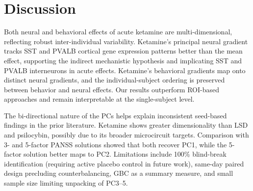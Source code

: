 \documentclass[11pt]{article}
\begin{document}
\section{Discussion}
Both neural and behavioral effects of acute ketamine are multi-dimensional, reflecting robust inter-individual variability. Ketamine's principal neural gradient tracks SST and PVALB cortical gene expression patterns better than the mean effect, supporting the indirect mechanistic hypothesis and implicating SST and PVALB interneurons in acute effects. Ketamine's behavioral gradients map onto distinct neural gradients, and the individual-subject ordering is preserved between behavior and neural effects. Our results outperform ROI-based approaches and remain interpretable at the single-subject level.

The bi-directional nature of the PCs helps explain inconsistent seed-based findings in the prior literature. Ketamine shows greater dimensionality than LSD and psilocybin, possibly due to its broader microcircuit targets. Comparison with 3- and 5-factor PANSS solutions showed that both recover PC1, while the 5-factor solution better maps to PC2. Limitations include 100\% blind-break identification (requiring active placebo control in future work), same-day paired design precluding counterbalancing, GBC as a summary measure, and small sample size limiting unpacking of PC3--5.



\end{document}
